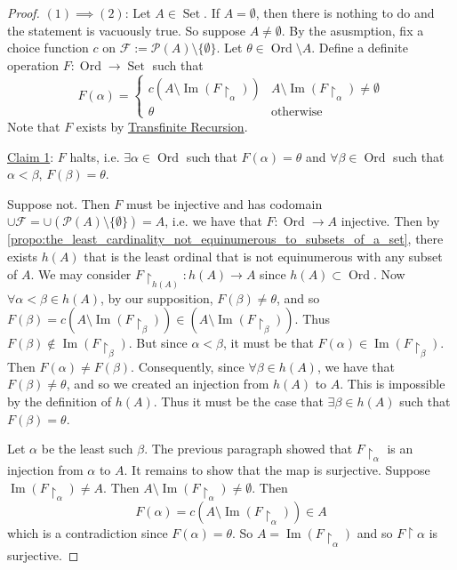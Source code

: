 \documentclass[notoc,notitlepage]{tufte-book}
\DeclareMathOperator{\Ord}{Ord }
\DeclareMathOperator{\Set}{Set }
\DeclareMathOperator{\Img}{Im }
\begin{document}
\begin{proof}
  $(1) \implies (2)$: Let $A \in \Set$. If $A = \emptyset$, then there is nothing to do and the statement is vacuously true. So suppose $A \neq \emptyset$.  By the asusmption, fix a choice function $c$ on $\mathcal{F} := \mathcal{P}(A) \setminus \{ \emptyset \}$. Let $\theta \in \Ord \setminus A$. Define a definite operation $F : \Ord \to \Set$ such that
  \begin{equation*}
    F(\alpha) = \begin{cases}
      c(A \setminus \Img(F\restriction_\alpha)) & A \setminus \Img(F\restriction_\alpha) \neq \emptyset \\
      \theta                                    & \text{otherwise}
    \end{cases}
  \end{equation*}
  Note that $F$ exists by \hyperref[thm:transfinite_recursion_v1]{Transfinite Recursion}.

  \underline{Claim 1}: $F$ halts, i.e. $\exists \alpha \in \Ord$ such that $F(\alpha) = \theta$ and $\forall \beta \in \Ord$ such that $\alpha < \beta$, $F(\beta) = \theta$.

  Suppose not. Then $F$ must be injective and has codomain $\cup \mathcal{F} = \cup ( \mathcal{P}(A) \setminus \{ \emptyset \} ) = A$, i.e. we have that $F : \Ord \to A$ injective. Then by \cref{propo:the_least_cardinality_not_equinumerous_to_subsets_of_a_set}, there exists $h(A)$ that is the least ordinal that is not equinumerous with any subset of $A$. We may consider $F \restriction_{h(A)} : h(A) \to A$ since $h(A) \subset \Ord$. Now $\forall \alpha < \beta \in h(A)$, by our supposition, $F(\beta) \neq \theta$, and so $F(\beta) = c(A \setminus \Img( F \restriction_\beta )) \in ( A \setminus \Img(F \restriction_\beta) )$. Thus $F(\beta) \notin \Img(F \restriction_\beta)$. But since $\alpha < \beta$, it must be that $F(\alpha) \in \Img(F \restriction_\beta)$. Then $F(\alpha) \neq F(\beta)$. Consequently, since $\forall \beta \in h(A)$, we have that $F(\beta) \neq \theta$, and so we created an injection from $h(A)$ to $A$. This is impossible by the definition of $h(A)$. Thus it must be the case that $\exists \beta \in h(A)$ such that $F(\beta) = \theta$.

  Let $\alpha$ be the least such $\beta$. The previous paragraph showed that $F \restriction_\alpha$ is an injection from $\alpha$ to $A$. It remains to show that the map is surjective. Suppose $\Img(F\restriction_\alpha) \neq A$. Then $A \setminus \Img(F\restriction_\alpha) \neq \emptyset$. Then
  \begin{equation*}
    F(\alpha) = c(A \setminus \Img(F \restriction_\alpha)) \in A
  \end{equation*}
  which is a contradiction since $F(\alpha) = \theta$. So $A = \Img(F\restriction_\alpha)$ and so $F \restriction \alpha$ is surjective.


\end{proof}
\end{document}
